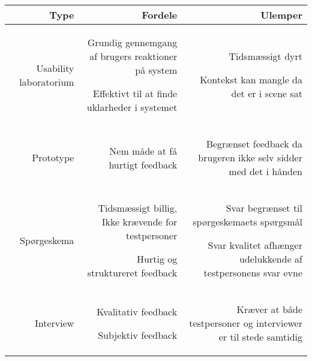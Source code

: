 \begin{table}[H]
\centering

    \begin{tabularx}{\textwidth}{|R|R|R|}
	\hline
		Type    				& Fordele	& Ulemper
		\\ \hline
		Usability laboratorium
		&
		\begin{noindlist}
		\item Grundig gennemgang af brugers reaktioner på system 
		\item Effektivt til at finde uklarheder i systemet
		\end{noindlist}
		&
		\begin{noindlist} 
		\item Tidsmæssigt dyrt
		\item Kontekst kan mangle da det er i scene sat
		\end{noindlist}
		\\ \hline
		Prototype  				
		&
		\begin{noindlist}
		\item Nem måde at få hurtigt feedback
		\end{noindlist}
		&
		\begin{noindlist}
		\item Begrænset feedback da brugeren ikke selv sidder med det i hånden
		\end{noindlist}
		\\ \hline
		Spørgeskema     		
		&
		\begin{noindlist}
		\item Tidsmæssigt billig, Ikke krævende for testpersoner
		\item Hurtig og struktureret feedback
		\end{noindlist}		 
		&
		\begin{noindlist}
		\item Svar begrænset til spørgeskemaets spørgsmål
		\item Svar kvalitet afhænger udelukkende af testpersonens svar evne
		\end{noindlist}
		\\ \hline
		Interview     			
		&
		\begin{noindlist}
		\item Kvalitativ feedback
		\item Subjektiv feedback 
		\end{noindlist}
		&
		\begin{noindlist}
		\item Kræver at både testpersoner og interviewer er til stede samtidig

\end{noindlist}
\end{tabularx}
\end{table}
